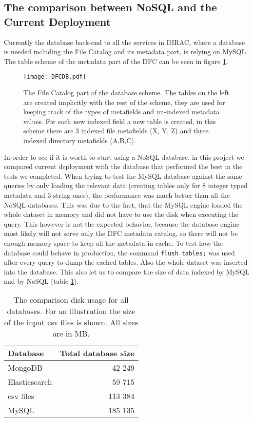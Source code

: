 \subsection{The comparison between NoSQL and the Current Deployment}

Currently the database back-end to all the services in DIRAC, where a database is needed including the File 
Catalog and its metadata part, is relying on MySQL. The table scheme of the metadata part of the DFC can be seen 
in figure \ref{fig:DFCUML}.

\begin{figure}[h]
	\centering
	\texttt{[image: DFCDB.pdf]}
	\caption{The File Catalog part of the database scheme. The tables on the left are created implicitly with the
	rest of the scheme, they are used  for keeping track of the types of metafields and un-indexed  metadata 
	values. For each new indexed field a new table is created, in this scheme there are 3 indexed file metafields
	(X, Y, Z) and three indexed directory metafields (A,B,C).}
	\label{fig:DFCUML}
\end{figure}

In order to see if it is worth to start using a NoSQL database, in this project we compared current deployment  
with the database that performed the
best in the tests we completed. When trying to test the MySQL database against the same queries 
by only loading the relevant data (creating tables only for 8 integer typed metadata and 3 string ones), the 
performance was much better than all the NoSQL databases. This was due to the fact, that the MySQL engine loaded
the whole dataset in memory and did not have to use the disk when executing the query. This however is not the expected 
behavior, because the database engine most likely will not serve only the DFC metadata catalog, so there will not
be enough memory space to keep all the metadata in cache. To test how the database could behave in production, the 
command \texttt{flush tables;} was used after every query to dump the cached tables. Also the whole dataset
was inserted into the database. This also let us to compare the size of data indexed by MySQL and by NoSQL (table 
\ref{tab:allDbSizes}). 

\begin{table}[h]
\centering
\begin{tabular}{|l|r|}
\hline
Database      & \multicolumn{1}{l|}{Total database size} \\ \hline
MongoDB       & 42 249                                   \\ \hline
Elasticsearch & 59 715                                   \\ \hline
csv files     & 113 384                                  \\ \hline
MySQL         & 185 135                                  \\ \hline
\end{tabular}
\caption{The comparison disk usage for all databases. For an illustration the size of the input csv files is
shown. All sizes are in MB.}
\label{tab:allDbSizes}
\end{table}

